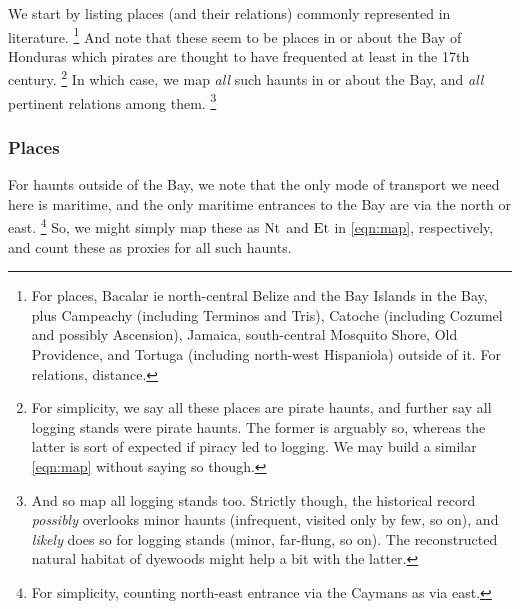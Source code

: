 		We start by listing places (and their relations) commonly represented in literature.%
		\footnote{For places, Bacalar ie north-central Belize and the Bay Islands in the Bay, plus Campeachy (including Terminos and Tris), Catoche (including Cozumel and possibly Ascension), Jamaica, south-central Mosquito Shore, Old Providence, and Tortuga (including north-west Hispaniola) outside of it. For relations, distance.}
		And note that these seem to be places in or about the Bay of Honduras which pirates are thought to have frequented at least in the 17th century.%
		\footnote{For simplicity, we say all these places are pirate haunts, and further say all logging stands were pirate haunts. The former is arguably so, whereas the latter is sort of expected if piracy led to logging. We may build a similar \ref{eqn:map} without saying so though.}
		In which case, we map \emph{all} such haunts in or about the Bay, and \emph{all} pertinent relations among them.%
		\footnote{And so map all logging stands too. Strictly though, the historical record \emph{possibly} overlooks minor haunts (infrequent, visited only by few, so on), and \emph{likely} does so for logging stands (minor, far-flung, so on). The reconstructed natural habitat of dyewoods might help a bit with the latter.}
	
		\subsubsection{Places}
		For haunts outside of the Bay, we note that the only mode of transport we need here is maritime, and the only maritime entrances to the Bay are via the north or east.%
		\footnote{For simplicity, counting north-east entrance via the Caymans as via east.}
		So, we might simply map these as \(\operatorname{Nt}\) and \(\operatorname{Et}\) in \ref{eqn:map}, respectively, and count these as proxies for all such haunts.
	
